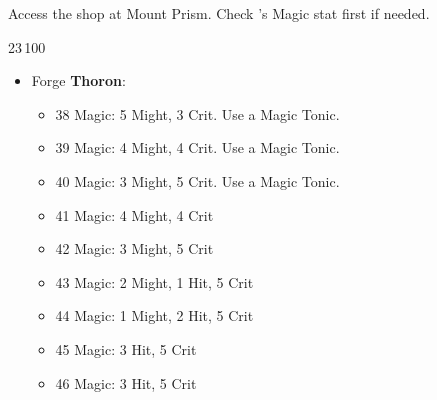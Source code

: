 Access the shop at Mount Prism. Check \robin's Magic stat first if needed.


\begin{shop}{23\,100}
\begin{itemize}
	\robinf
	\begin{itemize}
		\item Forge \textbf{Thoron}:
		\begin{itemize}
			\item 38 Magic: 5 Might, 3 Crit. Use a Magic Tonic.
			\item 39 Magic: 4 Might, 4 Crit. Use a Magic Tonic.
			\item 40 Magic: 3 Might, 5 Crit. Use a Magic Tonic.
			\item 41 Magic: 4 Might, 4 Crit
			\item 42 Magic: 3 Might, 5 Crit
			\item 43 Magic: 2 Might, 1 Hit, 5 Crit
			\item 44 Magic: 1 Might, 2 Hit, 5 Crit
			\item 45 Magic: 3 Hit, 5 Crit
			\item 46 Magic: 3 Hit, 5 Crit
		\end{itemize}
	\end{itemize}
\end{itemize}
\end{shop}